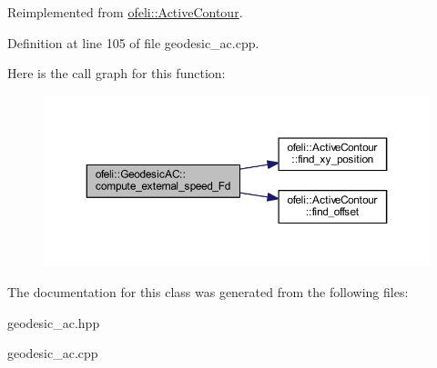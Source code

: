 Reimplemented from \hyperlink{classofeli_1_1_active_contour_ae3871b40f2f3e27ae0d75775798cdee1}{ofeli\-::\-Active\-Contour}.



Definition at line 105 of file geodesic\-\_\-ac.\-cpp.



Here is the call graph for this function\-:\nopagebreak
\begin{figure}[H]
\begin{center}
\leavevmode
\includegraphics[width=350pt]{classofeli_1_1_geodesic_a_c_a1e4d1d3011526eaff49b5404f00f27f9_cgraph}
\end{center}
\end{figure}




The documentation for this class was generated from the following files\-:\begin{DoxyCompactItemize}
\item 
geodesic\-\_\-ac.\-hpp\item 
geodesic\-\_\-ac.\-cpp\end{DoxyCompactItemize}
